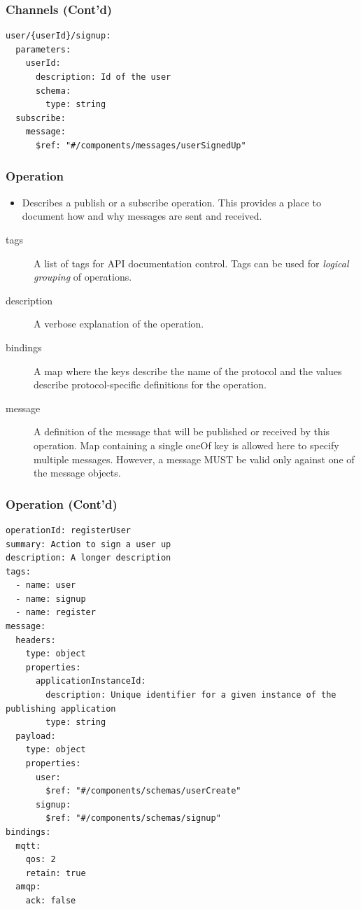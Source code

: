 \documentclass{efd-lecture}
\begin{document}
\begin{frame}[fragile]
  \frametitle{Channels (Cont'd)}
  \scriptsize
  \begin{verbatim}
user/{userId}/signup:
  parameters:
    userId:
      description: Id of the user
      schema:
        type: string
  subscribe:
    message:
      $ref: "#/components/messages/userSignedUp"
  \end{verbatim}
\end{frame}

\begin{frame}[fragile]
  \frametitle{Operation}
  \begin{itemize}
    \item Describes a publish or a subscribe operation. This provides a place to document how and why messages are sent and received.
  \end{itemize}
  \begin{description}
    \item[tags] A list of tags for API documentation control. Tags can be used for \textit{\color{YellowOrange} logical grouping} of operations.
    \item[description] A verbose explanation of the operation.
    \item[bindings] A map where the keys describe the name of the protocol and the values describe protocol-specific definitions for the operation.
    \item[message] A definition of the message that will be published or received by this operation. Map containing a single oneOf key is allowed here to specify multiple messages.
      However, a message MUST be valid only against one of the message objects.
  \end{description}
\end{frame}

\begin{frame}[fragile]
  \frametitle{Operation (Cont'd)}
  \scriptsize
  \begin{verbatim}
operationId: registerUser
summary: Action to sign a user up
description: A longer description
tags:
  - name: user
  - name: signup
  - name: register
message:
  headers:
    type: object
    properties:
      applicationInstanceId:
        description: Unique identifier for a given instance of the publishing application
        type: string
  payload:
    type: object
    properties:
      user:
        $ref: "#/components/schemas/userCreate"
      signup:
        $ref: "#/components/schemas/signup"
bindings:
  mqtt:
    qos: 2
    retain: true
  amqp:
    ack: false
  \end{verbatim}
\end{frame}
\end{document}

